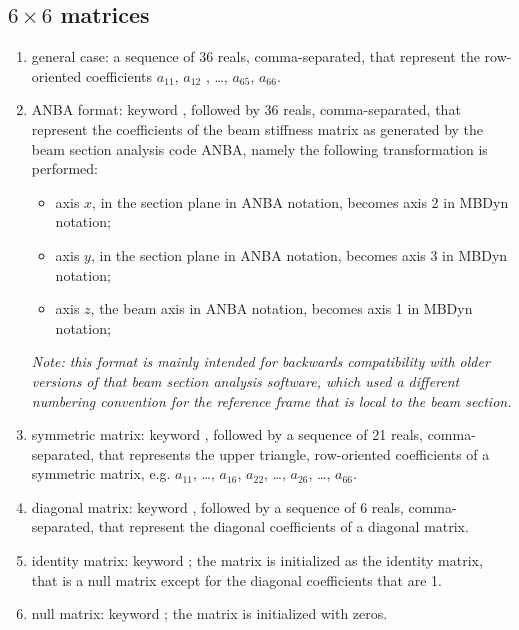 \subsection{$6 \times 6$ matrices}
\begin{enumerate}
    \item general case: a sequence of 36 reals, comma-separated, that
    represent the row-oriented coefficients $ a_{11} $, $ a_{12}$ ,
    \ldots, $ a_{65} $, $ a_{66} $.
    \item ANBA format: keyword , followed by 36 reals, 
    comma-separated, that represent the coefficients of the beam stiffness
    matrix as generated by the beam section analysis code ANBA,
    namely the following transformation is performed:
    \begin{itemize}
        \item axis $ x $, in the section plane in ANBA notation, 
	becomes axis 2 in MBDyn notation;    
	\item axis $ y $, in the section plane in ANBA notation, 
	becomes axis 3 in MBDyn notation;    
	\item axis $ z $, the beam axis in ANBA notation, 
	becomes axis 1 in MBDyn notation;    
    \end{itemize}
    \emph{Note: this format is mainly intended for backwards compatibility
    with older versions of that beam section analysis software,
    which used a different numbering convention for the reference frame
    that is local to the beam section.}
    \item symmetric matrix: keyword , followed by a sequence
    of 21 reals, comma-separated, that represents the upper triangle,
    row-oriented coefficients of a symmetric matrix, 
    e.g. $ a_{11} $, \ldots , $ a_{16} $, $ a_{22} $,
    \ldots , $ a_{26} $, \ldots, $ a_{66} $.
    \item diagonal matrix: keyword , followed by a sequence
    of 6 reals, comma-separated, that represent the diagonal coefficients 
    of a diagonal matrix.
    \item identity matrix: keyword ; the matrix is initialized
    as the identity matrix, that is a null matrix except for the diagonal 
    coefficients that are 1.
    \item null matrix: keyword ; the matrix is initialized 
    with zeros.
\end{enumerate}
